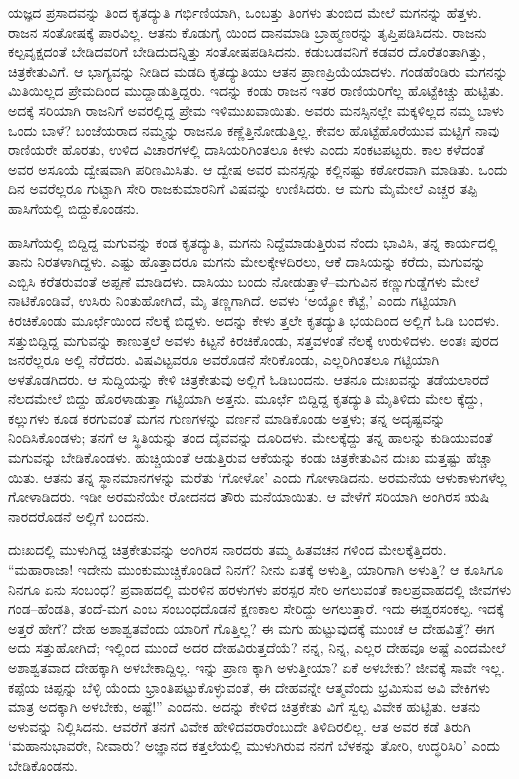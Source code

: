 ಯಜ್ಞದ ಪ್ರಸಾದವನ್ನು ತಿಂದ ಕೃತದ್ಯುತಿ ಗರ್ಭಿಣಿಯಾಗಿ, ಒಂಬತ್ತು ತಿಂಗಳು ತುಂಬಿದ ಮೇಲೆ ಮಗನನ್ನು ಹೆತ್ತಳು. ರಾಜನ ಸಂತೋಷಕ್ಕೆ ಪಾರವಿಲ್ಲ. ಆತನು ಕೊಡುಗೈ ಯಿಂದ ದಾನಮಾಡಿ ಬ್ರಾಹ್ಮಣರನ್ನು ತೃಪ್ತಿಪಡಿಸಿದನು. ರಾಜನು ಕಲ್ಪವೃಕ್ಷದಂತೆ ಬೇಡಿದವರಿಗೆ ಬೇಡಿದುದನ್ನಿತ್ತು ಸಂತೋಷಪಡಿಸಿದನು. ಕಡುಬಡವನಿಗೆ ಕಡವರ ದೊರೆತಂತಾಗಿತ್ತು, ಚಿತ್ರಕೇತುವಿಗೆ. ಆ ಭಾಗ್ಯವನ್ನು ನೀಡಿದ ಮಡದಿ ಕೃತದ್ಯುತಿಯು ಆತನ ಪ್ರಾಣಪ್ರಿಯೆಯಾದಳು. ಗಂಡಹೆಂಡಿರು ಮಗನನ್ನು ಮಿತಿಯಿಲ್ಲದ ಪ್ರೇಮದಿಂದ ಮುದ್ದಾಡುತ್ತಿದ್ದರು. ಇದನ್ನು ಕಂಡು ರಾಜನ ಇತರ ರಾಣಿಯರಿಗೆಲ್ಲ ಹೊಟ್ಟೆಕಿಚ್ಚು ಹುಟ್ಟಿತು. ಅದಕ್ಕೆ ಸರಿಯಾಗಿ ರಾಜನಿಗೆ ಅವರಲ್ಲಿದ್ದ ಪ್ರೇಮ ಇಳಿಮುಖವಾಯಿತು. ಅವರು ಮನಸ್ಸಿನಲ್ಲೇ ಮಕ್ಕಳಿಲ್ಲದ ನಮ್ಮ ಬಾಳು ಒಂದು ಬಾಳೆ? ಬಂಜೆಯರಾದ ನಮ್ಮನ್ನು ರಾಜನೂ ಕಣ್ಣೆತ್ತಿನೋಡುತ್ತಿಲ್ಲ. ಕೇವಲ ಹೊಟ್ಟೆಹೊರೆಯುವ ಮಟ್ಟಿಗೆ ನಾವು ರಾಣಿಯರೇ ಹೊರತು, ಉಳಿದ ವಿಚಾರಗಳಲ್ಲಿ ದಾಸಿಯರಿಗಿಂತಲೂ ಕೀಳು ಎಂದು ಸಂಕಟಪಟ್ಟರು. ಕಾಲ ಕಳೆದಂತೆ ಅವರ ಅಸೂಯೆ ದ್ವೇಷವಾಗಿ ಪರಿಣಮಿಸಿತು. ಆ ದ್ವೇಷ ಅವರ ಮನಸ್ಸನ್ನು ಕಲ್ಲಿನಷ್ಟು ಕಠೋರವಾಗಿ ಮಾಡಿತು. ಒಂದು ದಿನ ಅವರೆಲ್ಲರೂ ಗುಟ್ಟಾಗಿ ಸೇರಿ ರಾಜಕುಮಾರನಿಗೆ ವಿಷವನ್ನು ಉಣಿಸಿದರು. ಆ ಮಗು ಮೈಮೇಲೆ ಎಚ್ಚರ ತಪ್ಪಿ ಹಾಸಿಗೆಯಲ್ಲಿ ಬಿದ್ದುಕೊಂಡನು.

ಹಾಸಿಗೆಯಲ್ಲಿ ಬಿದ್ದಿದ್ದ ಮಗುವನ್ನು ಕಂಡ ಕೃತದ್ಯುತಿ, ಮಗನು ನಿದ್ದೆಮಾಡುತ್ತಿರುವ ನೆಂದು ಭಾವಿಸಿ, ತನ್ನ ಕಾರ್ಯದಲ್ಲಿ ತಾನು ನಿರತಳಾಗಿದ್ದಳು. ಎಷ್ಟು ಹೊತ್ತಾದರೂ ಮಗನು ಮೇಲಕ್ಕೇಳದಿರಲು, ಆಕೆ ದಾಸಿಯನ್ನು ಕರೆದು, ಮಗುವನ್ನು ಎಬ್ಬಿಸಿ ಕರೆತರುವಂತೆ ಅಪ್ಪಣೆ ಮಾಡಿದಳು. ದಾಸಿಯು ಬಂದು ನೋಡುತ್ತಾಳೆ–ಮಗುವಿನ ಕಣ್ಣುಗುಡ್ಡೆಗಳು ಮೇಲೆ ನಾಟಿಕೊಂಡಿವೆ, ಉಸಿರು ನಿಂತುಹೋಗಿದೆ, ಮೈ ತಣ್ಣಗಾಗಿದೆ. ಅವಳು ‘ಅಯ್ಯೋ ಕೆಟ್ಟೆ,’ ಎಂದು ಗಟ್ಟಿಯಾಗಿ ಕಿರಚಿಕೊಂಡು ಮೂರ್ಛೆಯಿಂದ ನೆಲಕ್ಕೆ ಬಿದ್ದಳು. ಅದನ್ನು ಕೇಳು ತ್ತಲೇ ಕೃತದ್ಯುತಿ ಭಯದಿಂದ ಅಲ್ಲಿಗೆ ಓಡಿ ಬಂದಳು. ಸತ್ತುಬಿದ್ದಿದ್ದ ಮಗುವನ್ನು ಕಾಣುತ್ತಲೆ ಅವಳು ಕಿಟ್ಟನೆ ಕಿರಚಿಕೊಂಡು, ಸತ್ತವಳಂತೆ ನೆಲಕ್ಕೆ ಉರುಳಿದಳು. ಅಂತಃ ಪುರದ ಜನರೆಲ್ಲರೂ ಅಲ್ಲಿ ನೆರೆದರು. ವಿಷವಿಟ್ಟವರೂ ಅವರೊಡನೆ ಸೇರಿಕೊಂಡು, ಎಲ್ಲರಿಗಿಂತಲೂ ಗಟ್ಟಿಯಾಗಿ ಅಳತೊಡಗಿದರು. ಆ ಸುದ್ದಿಯನ್ನು ಕೇಳಿ ಚಿತ್ರಕೇತುವು ಅಲ್ಲಿಗೆ ಓಡಿಬಂದನು. ಆತನೂ ದುಃಖವನ್ನು ತಡೆಯಲಾರದೆ ನೆಲದಮೇಲೆ ಬಿದ್ದು ಹೊರಳಾಡುತ್ತಾ ಗಟ್ಟಿಯಾಗಿ ಅತ್ತನು. ಮೂರ್ಛೆ ಬಿದ್ದಿದ್ದ ಕೃತದ್ಯುತಿ ಮೈತಿಳಿದು ಮೇಲ ಕ್ಕೆದ್ದು, ಕಲ್ಲುಗಳು ಕೂಡ ಕರಗುವಂತೆ ಮಗನ ಗುಣಗಳನ್ನು ವರ್ಣನೆ ಮಾಡಿಕೊಂಡು ಅತ್ತಳು; ತನ್ನ ಅದೃಷ್ಟವನ್ನು ನಿಂದಿಸಿಕೊಂಡಳು; ತನಗೆ ಆ ಸ್ಥಿತಿಯನ್ನು ತಂದ ದೈವವನ್ನು ದೂರಿದಳು. ಮೇಲಕ್ಕೆದ್ದು ತನ್ನ ಹಾಲನ್ನು ಕುಡಿಯುವಂತೆ ಮಗುವನ್ನು ಬೇಡಿಕೊಂಡಳು. ಹುಚ್ಚಿಯಂತೆ ಆಡುತ್ತಿರುವ ಆಕೆಯನ್ನು ಕಂಡು ಚಿತ್ರಕೇತುವಿನ ದುಃಖ ಮತ್ತಷ್ಟು ಹೆಚ್ಚಾ ಯಿತು. ಆತನು ತನ್ನ ಸ್ಥಾನಮಾನಗಳನ್ನು ಮರೆತು ‘ಗೋಳೋ’ ಎಂದು ಗೋಳಾಡಿದನು. ಅರಮನೆಯ ಆಳುಕಾಳುಗಳೆಲ್ಲ ಗೋಳಾಡಿದರು. ಇಡೀ ಅರಮನೆಯೇ ರೋದನದ ತೌರು ಮನೆಯಾಯಿತು. ಆ ವೇಳೆಗೆ ಸರಿಯಾಗಿ ಅಂಗಿರಸ ಋಷಿ ನಾರದರೊಡನೆ ಅಲ್ಲಿಗೆ ಬಂದನು.

ದುಃಖದಲ್ಲಿ ಮುಳುಗಿದ್ದ ಚಿತ್ರಕೇತುವನ್ನು ಅಂಗಿರಸ ನಾರದರು ತಮ್ಮ ಹಿತವಚನ ಗಳಿಂದ ಮೇಲಕ್ಕೆತ್ತಿದರು. “ಮಹಾರಾಜಾ! ಇದೇನು ಮುಂಕುಮುಚ್ಚಿಕೊಂಡಿದೆ ನಿನಗೆ? ನೀನು ಏತಕ್ಕೆ ಅಳುತ್ತಿ, ಯಾರಿಗಾಗಿ ಅಳುತ್ತಿ? ಆ ಕೂಸಿಗೂ ನಿನಗೂ ಏನು ಸಂಬಂಧ? ಪ್ರವಾಹದಲ್ಲಿ ಮರಳಿನ ಹರಳುಗಳು ಪರಸ್ಪರ ಸೇರಿ ಅಗಲುವಂತೆ ಕಾಲಪ್ರವಾಹದಲ್ಲಿ ಜೀವಗಳು ಗಂಡ–ಹೆಂಡತಿ, ತಂದೆ-ಮಗ ಎಂಬ ಸಂಬಂಧದೊಡನೆ ಕ್ಷಣಕಾಲ ಸೇರಿದ್ದು ಅಗಲುತ್ತಾರೆ. ಇದು ಈಶ್ವರಸಂಕಲ್ಪ. ಇದಕ್ಕೆ ಅತ್ತರೆ ಹೇಗೆ? ದೇಹ ಅಶಾಶ್ವತವೆಂದು ಯಾರಿಗೆ ಗೊತ್ತಿಲ್ಲ? ಈ ಮಗು ಹುಟ್ಟುವುದಕ್ಕೆ ಮುಂಚೆ ಆ ದೇಹವಿತ್ತೆ? ಈಗ ಅದು ಸತ್ತುಹೋಗಿದೆ; ಇಲ್ಲಿಂದ ಮುಂದೆ ಅದರ ದೇಹವಿರುತ್ತದೆಯೆ? ನನ್ನ, ನಿನ್ನ, ಎಲ್ಲರ ದೇಹವೂ ಅಷ್ಟೆ ಎಂದಮೇಲೆ ಅಶಾಶ್ವತವಾದ ದೇಹಕ್ಕಾಗಿ ಅಳಬೇಕಾದ್ದಿಲ್ಲ. ಇನ್ನು ಪ್ರಾಣ ಕ್ಕಾಗಿ ಅಳುತ್ತೀಯಾ? ಏಕೆ ಅಳಬೇಕು? ಜೀವಕ್ಕೆ ಸಾವೇ ಇಲ್ಲ. ಕಪ್ಪೆಯ ಚಿಪ್ಪನ್ನು ಬೆಳ್ಳಿ ಯೆಂದು ಭ್ರಾಂತಿಪಟ್ಟುಕೊಳ್ಳುವಂತೆ, ಈ ದೇಹವನ್ನೇ ಆತ್ಮವೆಂದು ಭ್ರಮಿಸುವ ಅವಿ ವೇಕಿಗಳು ಮಾತ್ರ ಅದಕ್ಕಾಗಿ ಅಳಬೇಕು, ಅಷ್ಟೆ!” ಎಂದನು. ಅದನ್ನು ಕೇಳಿದ ಚಿತ್ರಕೇತು ವಿಗೆ ಸ್ವಲ್ಪ ವಿವೇಕ ಹುಟ್ಟಿತು. ಆತನು ಅಳುವನ್ನು ನಿಲ್ಲಿಸಿದನು. ಆವರೆಗೆ ತನಗೆ ವಿವೇಕ ಹೇಳಿದವರಾರೆಂಬುದೇ ತಿಳಿದಿರಲಿಲ್ಲ. ಆತ ಅವರ ಕಡೆ ತಿರುಗಿ ‘ಮಹಾನುಭಾವರೇ, ನೀವಾರು? ಅಜ್ಞಾನದ ಕತ್ತಲೆಯಲ್ಲಿ ಮುಳುಗಿರುವ ನನಗೆ ಬೆಳಕನ್ನು ತೋರಿ, ಉದ್ಧರಿಸಿರಿ’ ಎಂದು ಬೇಡಿಕೊಂಡನು.

